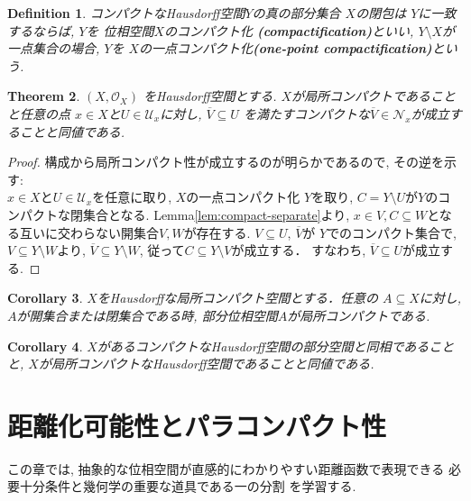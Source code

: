 \documentclass[lualatex]{ltjsbook}
\newcommand{\cl}[1]{\overline{ #1}  }
\newtheorem{theorem}{Theorem}[chapter]
\newtheorem{corollary}[theorem]{Corollary}
\newtheorem{definition}[theorem]{Definition}
\theoremstyle{remark}
\theoremstyle{plain}
\begin{document}
\begin{definition}
	コンパクトなHausdorff空間$Y$の真の部分集合 $X$の閉包は $Y$に一致するならば,  
	$Y$を 位相空間$X$のコンパクト化 \textbf{(compactification)}といい,  
	$Y \setminus X$が一点集合の場合, 
	$Y$を $X$の一点コンパクト化\textbf{(one-point compactification)}という.
\end{definition}



\begin{theorem}
	$\left( X ,  \mathcal{O}_{X} \right)$ をHausdorff空間とする. 
	$X$が局所コンパクトであることと任意の点 $x \in X$と$U \in \mathcal{U}_x$に対し,  
	$\overline{V} \subseteq U$ を満たすコンパクトな$\overline{V} \in  \mathcal{N}_x$が成立することと同値である.
\end{theorem}

\begin{proof}
	構成から局所コンパクト性が成立するのが明らかであるので,  その逆を示す:\\
	$x \in X$と$U \in \mathcal{U}_x$を任意に取り,  $X$の一点コンパクト化 $Y$を取り,  
	$C = Y \setminus U$が$Y$のコンパクトな閉集合となる. 
	Lemma\ref{lem:compact-separate}より, 
	$x \in V,  C \subseteq W $となる互いに交わらない開集合$V , W$が存在する. 
	$V \subseteq U$,  $\cl{V}$が $Y$でのコンパクト集合で,  
	$V \subseteq Y \setminus W$より,  
	$\cl{V} \subseteq Y \setminus W$, 
	従って$C \subseteq Y \setminus V$が成立する． 
	すなわち,  $\cl{V} \subseteq U$が成立する.
\end{proof}

\begin{corollary}
	$X$をHausdorffな局所コンパクト空間とする．任意の $A \subseteq X$に対し,  $A$が開集合または閉集合である時,  部分位相空間$A$が局所コンパクトである.
\end{corollary}

\begin{corollary}
	$X$があるコンパクトなHausdorff空間の部分空間と同相であることと,   $X$が局所コンパクトなHausdorff空間であることと同値である.
\end{corollary}







\chapter{距離化可能性とパラコンパクト性}
この章では, 抽象的な位相空間が直感的にわかりやすい距離函数で表現できる
必要十分条件と幾何学の重要な道具である一の分割
を学習する.
\end{document}
